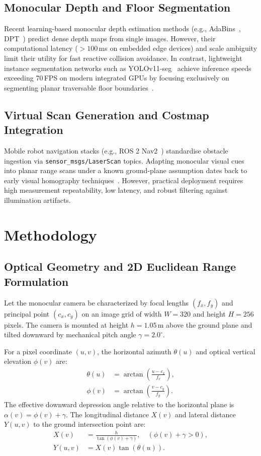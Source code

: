 \documentclass[12pt]{iopart}
\begin{document}
\subsection{Monocular Depth and Floor Segmentation}
Recent learning-based monocular depth estimation methods (e.g., AdaBins~\cite{shariqfarooqbhat_2021_adabins}, DPT~\cite{ranftl_2021_vision}) predict dense depth maps from single images. However, their computational latency ($>100$\,ms on embedded edge devices) and scale ambiguity limit their utility for fast reactive collision avoidance. In contrast, lightweight instance segmentation networks such as YOLOv11-seg~\cite{ultralytics_2024_ultralytics} achieve inference speeds exceeding 70\,FPS on modern integrated GPUs by focusing exclusively on segmenting planar traversable floor boundaries~\cite{wang_2021_a,dang_2023_obstacle}.

\subsection{Virtual Scan Generation and Costmap Integration}
Mobile robot navigation stacks (e.g., ROS 2 Nav2~\cite{macenski_2020_the,macenski_2022_robot,macenski_2023_from}) standardise obstacle ingestion via \texttt{sensor\_msgs/LaserScan} topics. Adapting monocular visual cues into planar range scans under a known ground-plane assumption dates back to early visual homography techniques~\cite{moravec_1985_high,fox_1997_the}. However, practical deployment requires high measurement repeatability, low latency, and robust filtering against illumination artifacts.

\section{Methodology}
\label{sec:methodology}

\subsection{Optical Geometry and 2D Euclidean Range Formulation}
Let the monocular camera be characterized by focal lengths $(f_x, f_y)$ and principal point $(c_x, c_y)$ on an image grid of width $W = 320$ and height $H = 256$ pixels. The camera is mounted at height $h = 1.05$\,m above the ground plane and tilted downward by mechanical pitch angle $\gamma = 2.0^\circ$.

For a pixel coordinate $(u, v)$, the horizontal azimuth $\theta(u)$ and optical vertical elevation $\phi(v)$ are:
\begin{align}
  \theta(u) &= \arctan\left(\frac{u - c_x}{f_x}\right), \\
  \phi(v)   &= \arctan\left(\frac{v - c_y}{f_y}\right).
\end{align}
The effective downward depression angle relative to the horizontal plane is $\alpha(v) = \phi(v) + \gamma$. The longitudinal distance $X(v)$ and lateral distance $Y(u, v)$ to the ground intersection point are:
\begin{align}
  X(v) &= \frac{h}{\tan(\phi(v) + \gamma)}, \quad (\phi(v) + \gamma > 0), \\
  Y(u, v) &= X(v) \tan(\theta(u)).
\end{align}
\end{document}

